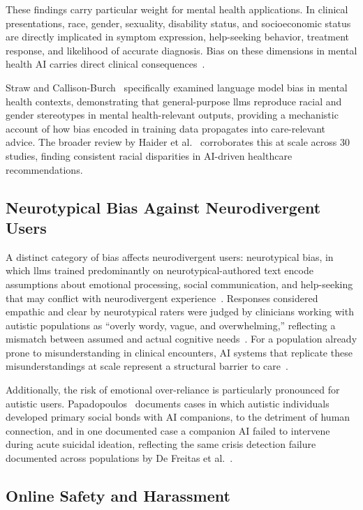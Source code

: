These findings carry particular weight for mental health applications. In clinical presentations, race, gender, sexuality, disability status, and socioeconomic status are directly implicated in symptom expression, help-seeking behavior, treatment response, and likelihood of accurate diagnosis. Bias on these dimensions in mental health AI carries direct clinical consequences~\cite{timmons_2023,haider_2024}.

Straw and Callison-Burch~\cite{straw_2020} specifically examined language model bias in mental health contexts, demonstrating that general-purpose \gls{llm}s reproduce racial and gender stereotypes in mental health-relevant outputs, providing a mechanistic account of how bias encoded in training data propagates into care-relevant advice. The broader review by Haider et al.~\cite{haider_2024} corroborates this at scale across 30 studies, finding consistent racial disparities in AI-driven healthcare recommendations.

\subsection{Neurotypical Bias Against Neurodivergent Users}

A distinct category of bias affects neurodivergent users: neurotypical bias, in which \gls{llm}s trained predominantly on neurotypical-authored text encode assumptions about emotional processing, social communication, and help-seeking that may conflict with neurodivergent experience~\cite{killian_2023}. Responses considered empathic and clear by neurotypical raters were judged by clinicians working with autistic populations as ``overly wordy, vague, and overwhelming,'' reflecting a mismatch between assumed and actual cognitive needs~\cite{killian_2023}. For a population already prone to misunderstanding in clinical encounters, AI systems that replicate these misunderstandings at scale represent a structural barrier to care~\cite{papadopoulos_2025}.

Additionally, the risk of emotional over-reliance is particularly pronounced for autistic users. Papadopoulos~\cite{papadopoulos_2025} documents cases in which autistic individuals developed primary social bonds with AI companions, to the detriment of human connection, and in one documented case a companion AI failed to intervene during acute suicidal ideation, reflecting the same crisis detection failure documented across populations by De Freitas et al.~\cite{de_freitas_2024}.

\subsection{Online Safety and Harassment}

